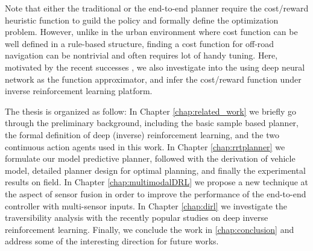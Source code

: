 \documentclass[../thesis.tex]{subfiles}
\begin{document}
Note that either the traditional or the end-to-end planner require the cost/reward heuristic function to guild the policy and formally define the optimization problem. 
However, unlike in the urban environment where cost function can be well defined in a rule-based structure, finding a cost function for off-road navigation can be nontrivial and often requires lot of handy tuning. \cite{silver2010learning}
Here, motivated by the recent successes \cite{wulfmeier2015maximum,wulfmeier2016watch}, we also investigate into the using deep neural network as the function approximator, and infer the cost/reward function under inverse reinforcement learning platform.

The thesis is organized as follow:
In Chapter \ref{chap:related_work} we briefly go through the preliminary background, including the basic sample based planner, the formal definition of deep (inverse) reinforcement learning, and the two continuous action agents used in this work.
In Chapter \ref{chap:rrtplanner} we formulate our model predictive planner, followed with the derivation of vehicle model, detailed planner design for optimal planning, and finally the experimental results on field.
In Chapter \ref{chap:multimodalDRL} we propose a new technique at the aspect of sensor fusion in order to improve the performance of the end-to-end controller with multi-sensor inputs. 
In Chapter \ref{chap:dirl} we investigate the traversibility analysis with the recently popular studies on deep inverse reinforcement learning.
Finally, we conclude the work in \ref{chap:conclusion} and address some of the interesting direction for future works.
\end{document}
